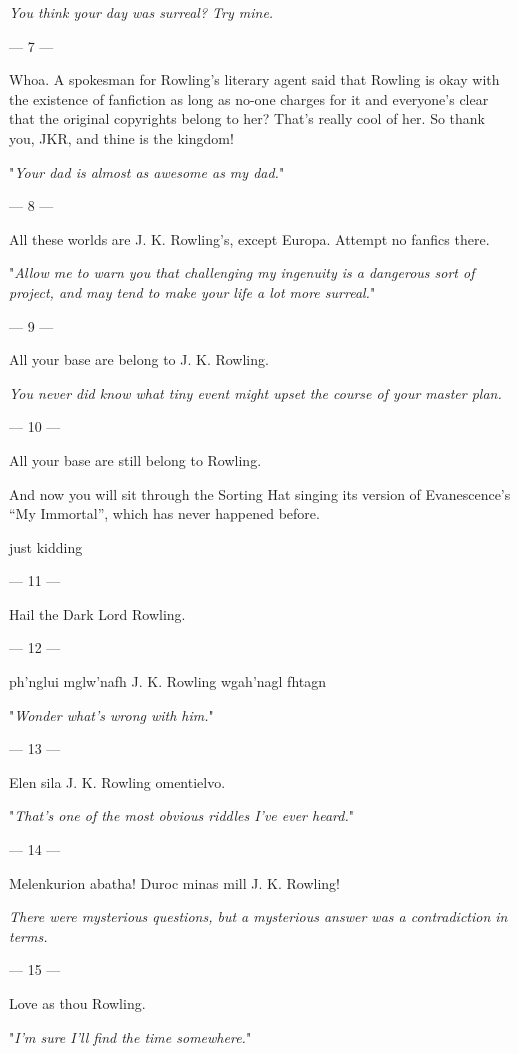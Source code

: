 {\emph{You think your day was surreal? Try mine.}

\filbreak
--- 7 ---

Whoa. A spokesman for Rowling’s literary agent said that Rowling is okay with the existence of fanfiction as long as no-one charges for it and everyone’s clear that the original copyrights belong to her? That’s really cool of her. So thank you, JKR, and thine is the kingdom!

"\emph{Your dad is almost as awesome as my dad.}"

\filbreak
--- 8 ---

All these worlds are J. K. Rowling’s, except Europa. Attempt no fanfics there.

"\emph{Allow me to warn you that challenging my ingenuity is a dangerous sort of project, and may tend to make your life a lot more surreal.}"

\filbreak
--- 9 ---

All your base are belong to J. K. Rowling.

\emph{You never did know what tiny event might upset the course of your master plan.}

\filbreak
--- 10 ---

All your base are still belong to Rowling.

And now you will sit through the Sorting Hat singing its version of Evanescence’s “My Immortal”, which has never happened before.

just kidding

\filbreak
--- 11 ---

Hail the Dark Lord Rowling.

\filbreak
--- 12 ---

ph’nglui mglw’nafh J. K. Rowling wgah’nagl fhtagn

"\emph{Wonder what’s wrong with \emph{him}.}"

\filbreak
--- 13 ---

Elen sila J. K. Rowling omentielvo.

"\emph{That’s one of the most obvious riddles I’ve ever heard.}"

\filbreak
--- 14 ---

Melenkurion abatha! Duroc minas mill J. K. Rowling!

\emph{There were mysterious questions, but a mysterious answer was a
contradiction in terms.}

\filbreak
--- 15 ---

Love as thou Rowling.

"\emph{I’m sure I’ll find the time somewhere.}"

}
